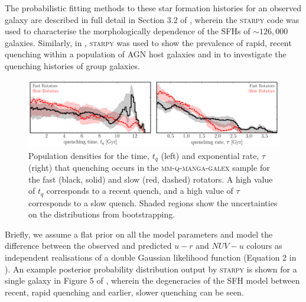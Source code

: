 \documentclass[useAMS,usenatbib]{mn2e}
\begin{document}
The probabilistic fitting methods to these star formation histories for an observed galaxy are described in full detail in Section 3.2 of \cite{smethurst15}, wherein the \textsc{starpy} code was used to characterise the morphologically dependence of the SFHs of $\sim126,000$ galaxies. Similarly, in \cite{smethurst16}, \textsc{starpy} was used to show the prevalence of rapid, recent quenching within a population of AGN host galaxies and in \cite{smethurst17} to investigate the quenching histories of group galaxies.  

\begin{figure}
\centering
\includegraphics[width=\textwidth]{../figures/quenching_time_rate_FR_SR_nonkdc_MM_NSF_1sigma_C16_VOR10.pdf}
\caption{Population densities for the time, $t_q$ (left) and exponential rate, $\tau$ (right) that quenching occurs in the \textsc{mm-q-manga-galex} sample for the fast (black, solid) and slow (red, dashed) rotators. A high value of $t_q$ corresponds to a recent quench, and a high value of $\tau$ corresponds to a slow quench. Shaded regions show the uncertainties on the distributions from bootstrapping. %
}
\label{fig:popfrvsr}
\end{figure}

Briefly, we assume a flat prior on all the model parameters and model the difference between the observed and predicted $u-r$ and $NUV-u$ colours as independent realisations of a double Gaussian likelihood function (Equation 2 in \citealt{smethurst15}). An example posterior probability distribution output by \textsc{starpy} is shown for a single galaxy in Figure 5 of \cite{smethurst15}, wherein the degeneracies of the SFH model between recent, rapid quenching and earlier, slower quenching can be seen.
\end{document}
